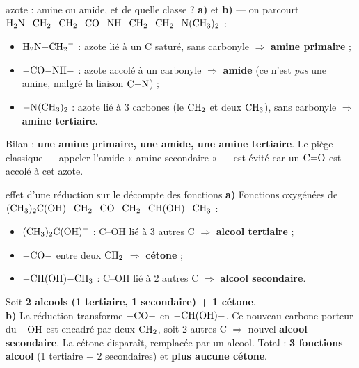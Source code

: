 \documentclass[11pt,a4paper]{article}
\newcommand{\rep}[1]{\textcolor{primarydark}{\textbf{#1}}}
\begin{document}
\begin{corr}{azote : amine ou amide, et de quelle classe ?}
\textbf{a)} et \textbf{b)} — on parcourt $\ce{H2N-CH2-CH2-CO-NH-CH2-CH2-N(CH3)2}$ :
\begin{itemize}[leftmargin=1.6em,itemsep=1pt]
  \item $\ce{H2N-CH2-}$ : azote lié à un C saturé, sans carbonyle $\Rightarrow$ \rep{amine primaire} ;
  \item $\ce{-CO-NH-}$ : azote accolé à un carbonyle $\Rightarrow$ \rep{amide} (ce n'est \emph{pas} une amine, malgré la liaison $\ce{C-N}$) ;
  \item $\ce{-N(CH3)2}$ : azote lié à 3 carbones (le $\ce{CH2}$ et deux $\ce{CH3}$), sans carbonyle $\Rightarrow$ \rep{amine tertiaire}.
\end{itemize}
Bilan : \rep{une amine primaire, une amide, une amine tertiaire}. Le piège classique — appeler l'amide « amine secondaire » — est évité car un $\ce{C=O}$ est accolé à cet azote.
\end{corr}

\begin{corr}{effet d'une réduction sur le décompte des fonctions}
\textbf{a)} Fonctions oxygénées de $(\ce{CH3})_2\ce{C(OH)-CH2-CO-CH2-CH(OH)-CH3}$ :
\begin{itemize}[leftmargin=1.6em,itemsep=1pt]
  \item $(\ce{CH3})_2\ce{C(OH)-}$ : C--OH lié à 3 autres C $\Rightarrow$ \rep{alcool tertiaire} ;
  \item $\ce{-CO-}$ entre deux $\ce{CH2}$ $\Rightarrow$ \rep{cétone} ;
  \item $\ce{-CH(OH)-CH3}$ : C--OH lié à 2 autres C $\Rightarrow$ \rep{alcool secondaire}.
\end{itemize}
Soit \rep{2 alcools (1 tertiaire, 1 secondaire) + 1 cétone}.\\
\textbf{b)} La réduction transforme $\ce{-CO-}$ en $\ce{-CH(OH)-}$. Ce nouveau carbone porteur du $\ce{-OH}$ est encadré par deux $\ce{CH2}$, soit 2 autres C $\Rightarrow$ nouvel \rep{alcool secondaire}. La cétone disparaît, remplacée par un alcool. Total : \rep{3 fonctions alcool} (1 tertiaire + 2 secondaires) et \rep{plus aucune cétone}.
\end{corr}
\end{document}
